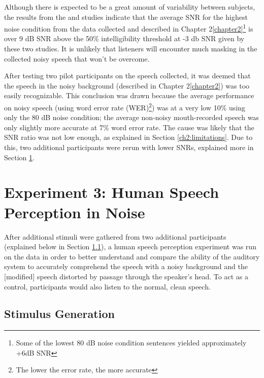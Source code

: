\documentclass[dissertation,copyright]{uathesis}
\begin{document}
Although there is expected to be a great amount of variability between subjects, the results from the \cite{ding:13} and \cite{gilbert:13} studies indicate that the average SNR for the highest noise condition from the data collected and described in Chapter 2\ref{chapter2}\footnote{Some of the lowest 80 dB noise condition sentences yielded approximately +6dB SNR} is over 9 dB SNR above the 50\% intelligibility threshold at -3 db SNR given by these two studies.  It is unlikely that listeners will encounter much masking in the collected noisy speech that won't be overcome.

After testing two pilot participants on the speech collected, it was deemed that the speech in the noisy background (described in Chapter 2\ref{chapter2}) was too easily recognizable.  This conclusion was drawn because the average performance on noisy speech (using word error rate (WER)\footnote{The lower the error rate, the more accurate}) was at a very low 10\% using only the 80 dB noise condition; the average non-noisy mouth-recorded speech was only slightly more accurate at 7\% word error rate. The cause was likely that the SNR ratio was not low enough, as explained in Section \ref{ch2:limitations}.  Due to this, two additional participants were rerun with lower SNRs, explained more in Section \ref{expt3}.




\section{Experiment 3: Human Speech Perception in Noise}
\label{expt3}

After additional stimuli were gathered from two additional participants (explained below in Section \ref{chap4:methods:stimuli}), a human speech perception experiment was run on the data in order to better understand and compare the ability of the auditory system to accurately comprehend the speech with a noisy background and the [modified] speech distorted by passage through the speaker's head.  To act as a control, participants would also listen to the normal, clean speech.

\subsection{Stimulus Generation}
\label{chap4:methods:stimuli}
\end{document}
